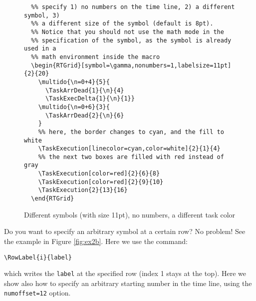 \documentclass{article}
\begin{document}
\begin{figure}[h]
  \centering
  \begin{RTGrid}[width=8cm,symbol=\gamma,nonumbers=1,labelsize=11pt]{2}{20}
  \end{RTGrid}

\begin{verbatim}
  %% specify 1) no numbers on the time line, 2) a different symbol, 3)
  %% a different size of the symbol (default is 8pt).
  %% Notice that you should not use the math mode in the
  %% specification of the symbol, as the symbol is already used in a
  %% math environment inside the macro
  \begin{RTGrid}[symbol=\gamma,nonumbers=1,labelsize=11pt]{2}{20}
    \multido{\n=0+4}{5}{         
      \TaskArrDead{1}{\n}{4}    
      \TaskExecDelta{1}{\n}{1}}
    \multido{\n=0+6}{3}{         
      \TaskArrDead{2}{\n}{6}    
    }
    %% here, the border changes to cyan, and the fill to white
    \TaskExecution[linecolor=cyan,color=white]{2}{1}{4}
    %% the next two boxes are filled with red instead of gray
    \TaskExecution[color=red]{2}{6}{8}
    \TaskExecution[color=red]{2}{9}{10}
    \TaskExecution{2}{13}{16}        
  \end{RTGrid}
\end{verbatim}
  \caption{Different symbols (with size 11pt), no numbers, a different
    task color}
  \label{fig:ex2a}
\end{figure}

Do you want to specify an arbitrary symbol at a certain row?
No problem! See the example in Figure \ref{fig:ex2b}. Here we use the command:
\begin{verbatim}
\RowLabel{i}{label}
\end{verbatim}
which writes the \texttt{label} at the specified row (index 1 stays at
the top). Here we show also how to specify an arbitrary starting
number in the time line, using the \texttt{numoffset=12} option.
\end{document}
